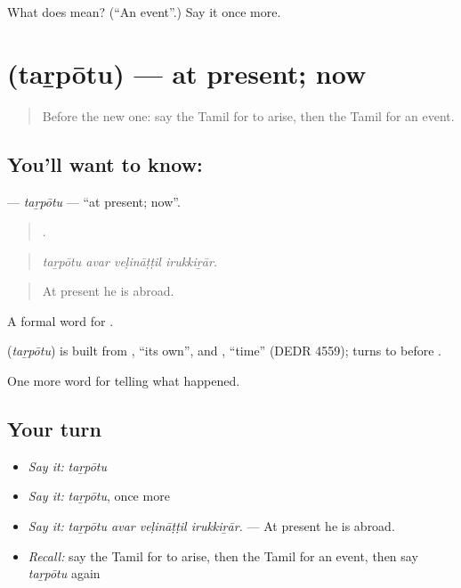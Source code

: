 \begin{tcolorbox}[breakable,colback=teal!4,colframe=teal!35!black,title={Before you move on}]
What does  mean? (\textquotedblleft{}An event\textquotedblright{}.) Say it once more.
\end{tcolorbox}
\section[\texorpdfstring{\ta{தற்போது} (taṟpōtu)}{தற்போது (taṟpōtu)}]{ (taṟpōtu) — at present; now}

\label{lesson:TA-C315-tarpotu}



\begin{quote}
Before the new one: say the Tamil for to arise, then the Tamil for an event.
\end{quote}

\subsection*{You'll want to know: }
\textbf{} — \emph{taṟpōtu} — \textquotedblleft{}at present; now\textquotedblright{}.

\begin{quote}
   .
\end{quote}

\begin{quote}
\emph{taṟpōtu avar veḷināṭṭil irukkiṟār.}
\end{quote}

\begin{quote}
At present he is abroad.
\end{quote}

A formal word for .

\begin{cousinweb}
\textbf{} (\emph{taṟpōtu}) is built from , \textquotedblleft{}its own\textquotedblright{}, and , \textquotedblleft{}time\textquotedblright{} (DEDR 4559);  turns to  before .
\end{cousinweb}

\begin{grammarlens}[title={What you've built}]
One more word for telling what happened.
\end{grammarlens}

\subsection*{Your turn}
\begin{itemize}
\raggedright
  \item \emph{Say it:} \emph{taṟpōtu}
  \item \emph{Say it:} \emph{taṟpōtu}, once more
  \item \emph{Say it:} \emph{taṟpōtu avar veḷināṭṭil irukkiṟār.} — At present he is abroad.
  \item \emph{Recall:} say the Tamil for to arise, then the Tamil for an event, then say \emph{taṟpōtu} again
\end{itemize}

